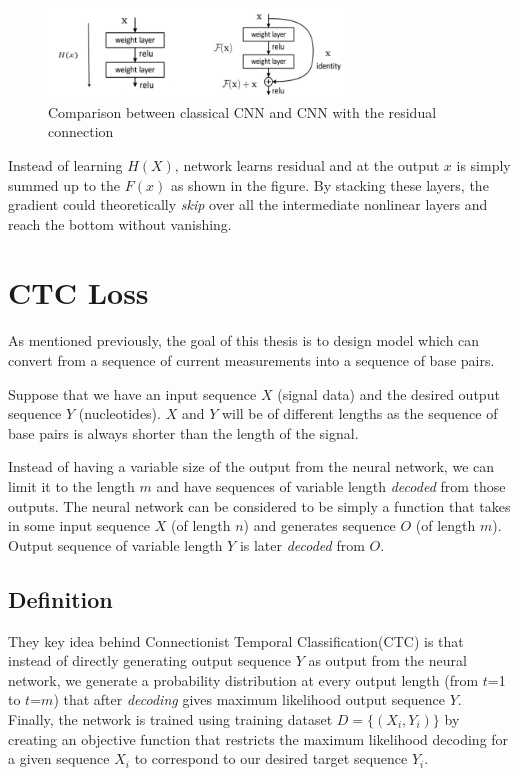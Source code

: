 \documentclass[times, utf8, diplomski, numeric, english]{fer}
\begin{document}
\begin{figure}[!ht]
	\begin{center}
		\includegraphics[width=0.7\textwidth]{./imgs/resnet_block.png}
		\caption[Comparison between classical CNN and CNN with the residual connection ]{Comparison between classical CNN and CNN with the residual connection \protect\footnotemark}
		\label{fg:resnet_block}
	\end{center}
\end{figure}
Instead of learning $H(X)$, network learns residual and at the output $x$ is simply summed up to the $F(x)$ as shown in the figure.  By stacking these layers, the gradient could theoretically \textit{skip} over all the intermediate nonlinear layers and reach the bottom without vanishing.




\section{CTC Loss}

As mentioned previously, the goal of this thesis is to design model which can convert from a sequence of current measurements into a sequence of base pairs.

Suppose that we have an input sequence $X$ (signal data) and the desired output sequence $Y$ (nucleotides). $X$ and $Y$ will be of different lengths as the sequence of base pairs is always shorter than the length of the signal.

Instead of having a variable size of the output from the neural network, we can limit it to the length $m$ and have sequences of variable length \textit{decoded} from those outputs. The neural network can be considered to be simply a function that takes in some input sequence $X$ (of length $n$) and generates sequence $O$ (of length $m$). Output sequence of variable length $Y$ is later \textit{decoded} from $O$.

\subsection{Definition}
They key idea behind Connectionist Temporal Classification(CTC)\cite{Graves:2006:CTC:1143844.1143891} is that instead of directly generating output sequence $Y$ as output from the neural network, we  generate a probability distribution at every output length (from $t$=1 to $t$=$m$) that after \textit{decoding} gives maximum likelihood output sequence $Y$. 
Finally, the network is trained using training dataset $D = \{(X_i, Y_i)\}$ by creating an objective function that restricts the maximum likelihood decoding for a given sequence $X_i$ to correspond to our desired target sequence $Y_i$.
\end{document}
